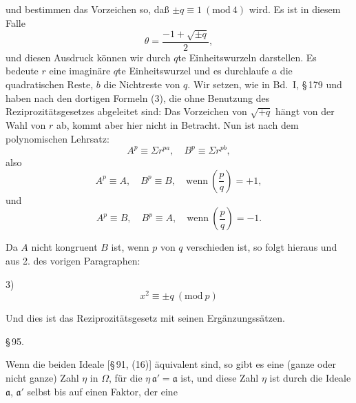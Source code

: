 
und bestimmen das Vorzeichen so, daß $\pm q \equiv 1 \ (\mathrm{mod}\ 4)$ wird.
Es ist in diesem Falle
\[
\theta = \frac{-1 + \sqrt{\pm q}}{2},
\]
und diesen Ausdruck können wir durch $q$te Einheitswurzeln darstellen. Es bedeute $r$ eine imaginäre $q$te Einheitswurzel und es
durchlaufe $a$ die quadratischen Reste, $b$ die Nichtreste von $q$.
Wir setzen, wie in Bd.\ I, \S\,179
und haben nach den dortigen Formeln (3), die ohne Benutzung
des Reziprozitätsgesetzes abgeleitet sind:
Das Vorzeichen von $\sqrt{+q}$ hängt von der Wahl von $r$ ab,
kommt aber hier nicht in Betracht. Nun ist nach dem polynomischen
 Lehrsatz:
\[
A^p \equiv \Sigma r^{pa}, \quad B^p \equiv \Sigma r^{pb},
\]
also
\[
A^p \equiv A, \quad B^p \equiv B, \quad \text{wenn} \ \left(\frac{p}{q}\right) = +1,
\]
und
\[
A^p \equiv B, \quad B^p \equiv A, \quad \text{wenn} \ \left(\frac{p}{q}\right) = -1.
\]

Da $A$ nicht kongruent $B$ ist, wenn $p$ von $q$ verschieden ist,
so folgt hieraus und aus 2. des vorigen Paragraphen:

3) 
\[
x^2 \equiv \pm q \ (\mathrm{mod}\ p)
\]

Und dies ist das Reziprozitätsgesetz mit seinen Ergänzungssätzen.

\S\,95. 

Wenn die beiden Ideale [\S\,91, (16)]
äquivalent sind, so gibt es eine (ganze oder nicht ganze) Zahl $\eta$
in $\Omega$, für die $\eta\, \mathfrak{a}' = \mathfrak{a}$ ist, und diese Zahl $\eta$ ist durch die Ideale
$\mathfrak{a}$, $\mathfrak{a}'$ selbst bis auf einen Faktor, der eine 
